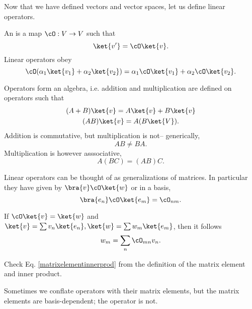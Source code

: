 Now that we have defined vectors and vector spaces, let us define linear operators.
\begin{defn}
An  is a map $\cO: V\to V$ such that
\begin{equation}
    \ket{v'}=\cO \ket{v}.
\end{equation}
Linear operators obey
\begin{equation}
    \cO(\alpha_1\ket{v_1}+\alpha_2 \ket{v_2})=\alpha_1 \cO \ket{v_1} +\alpha_2 \cO \ket{v_2}.
\end{equation}
\end{defn}

Operators form an algebra, i.e. addition and multiplication are defined on operators such that
\begin{gather}
    (A+B)\ket{v}=A\ket{v} + B\ket{v}\\
    (AB)\ket{v}= A(B\ket{V}).
\end{gather}
Addition is commutative, but multiplication is not-- generically,
\begin{equation}
    AB \neq BA.
\end{equation}
Multiplication is however asssociative,
\begin{equation}
    A(BC)=(AB)C.
\end{equation}

Linear operators can be thought of as generalizations of matrices. In particular they have  given by $\bra{v} \cO \ket{w}$ or in a basis,
\begin{equation}
    \bra{e_n} \cO \ket{e_m} = \cO_{nm}.
\end{equation}

If $\cO\ket{v}=\ket{w}$ and $\ket{v}=\sum v_n \ket{e_n},\ket{w} = \sum w_m \ket{e_m}$, then it follows 
\begin{equation}\label{matrixelementinnerprod}
    w_m = \sum_n \cO_{mn} v_n.
\end{equation}
\begin{ex}
    Check Eq. \ref{matrixelementinnerprod} from the definition of the matrix element and inner product.
\end{ex}
Sometimes we conflate operators with their matrix elements, but the matrix elements are basis-dependent; the operator is not.

